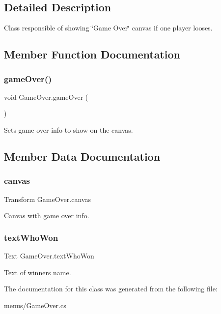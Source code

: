 \subsection{Detailed Description}
Class responsible of showing \char`\"{}\+Game Over\char`\"{} canvas if one player looses. 



\subsection{Member Function Documentation}
\mbox{\label{class_game_over_a03d824dff5b997d7566f5e7bb5326609}} 
\subsubsection{\texorpdfstring{game\+Over()}{gameOver()}}
{\footnotesize\ttfamily void Game\+Over.\+game\+Over (\begin{DoxyParamCaption}{ }\end{DoxyParamCaption})}



Sets game over info to show on the canvas. 



\subsection{Member Data Documentation}
\mbox{\label{class_game_over_ad71e27e7f62da1f7abba74e31d89e9d5}} 
\subsubsection{\texorpdfstring{canvas}{canvas}}
{\footnotesize\ttfamily Transform Game\+Over.\+canvas}



Canvas with game over info. 

\mbox{\label{class_game_over_a05fc5c0c7a78b9a32de2bd9a9bfcac57}} 
\subsubsection{\texorpdfstring{text\+Who\+Won}{textWhoWon}}
{\footnotesize\ttfamily Text Game\+Over.\+text\+Who\+Won}



Text of winner\textquotesingle{}s name. 



The documentation for this class was generated from the following file\+:\begin{DoxyCompactItemize}
\item 
menus/Game\+Over.\+cs\end{DoxyCompactItemize}
